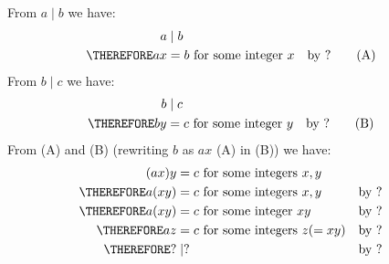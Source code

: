 From $a \mid b$ we have:
\begin{align*}
a &\mid b  \\
\THEREFORE ax &= b \text{ for some integer $x$} & & \text{by ?} \tag{A}
\end{align*}
From $b \mid c$ we have:
\begin{align*}
b &\mid c  \\
\THEREFORE by &= c \text{ for some integer $y$} & & \text{by ?} \tag{B}
\end{align*}
From (A) and (B) (rewriting $b$ as $ax$ (A) in (B)) we have:
\begin{align*}
           (ax)y &= c \text{ for some integers $x, y$}                     \\
\THEREFORE a(xy) &= c \text{ for some integers $x, y$}     & & \text{by ?} \\
\THEREFORE a(xy) &= c \text{ for some integer  $xy$}       & & \text{by ?} \\
\THEREFORE az    &= c \text{ for some integers $z (= xy)$} & & \text{by ?} \\
\THEREFORE ? &\mid ?                                       & & \text{by ?} 
\end{align*}

